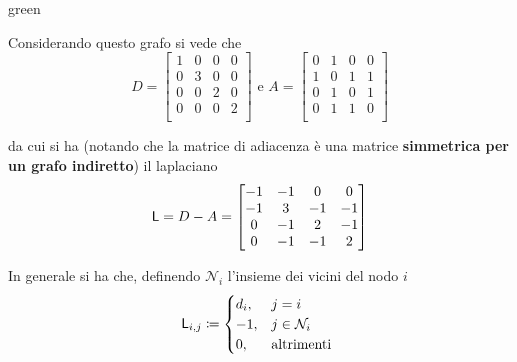 \begin{mybox}{green}{}
\begin{minipage}{0.5\textwidth}
\begin{center}
 \end{center}
Considerando questo grafo si vede che
\begin{equation*}
D = \begin{bmatrix}
1 & 0 & 0 & 0 \\
0 & 3 & 0 & 0 \\
0 & 0 & 2 & 0 \\
0 & 0 & 0 & 2 \\
\end{bmatrix}
\text{ e }
A = \begin{bmatrix}
0 & 1 & 0 & 0 \\
1 & 0 & 1 & 1 \\
0 & 1 & 0 & 1 \\
0 & 1 & 1 & 0 \\
\end{bmatrix}
\end{equation*}
\end{minipage}
\begin{minipage}{0.5\textwidth}
da cui si ha (notando che la matrice di adiacenza \`e una matrice \textbf{simmetrica per un grafo indiretto}) il laplaciano
\begin{equation*}
\mathsf{L} = D - A = \begin{bmatrix}
-1 & -1 & 0 & 0 \\
-1 & 3 & -1 & -1 \\
0 & -1 & 2 & -1 \\
0 & -1 & -1 & 2 \\
\end{bmatrix}
\end{equation*}
\end{minipage}
\end{mybox}

In generale si ha che, definendo $\mathcal{N}_i$ l'insieme dei vicini del nodo $i$
\begin{equation}
\mathsf{L}_{i,j} \coloneqq \begin{cases}
d_i, & j=i \\
-1, & j \in \mathcal{N}_i\\
0, & \text{altrimenti }
\end{cases}
\end{equation}


